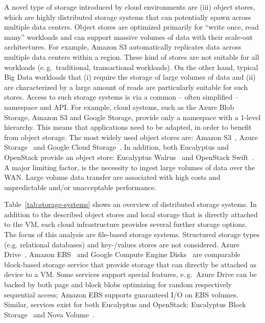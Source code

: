 \documentclass[times]{cpeauth}
\begin{document}
A novel type of storage introduced by cloud environments are (iii)
object stores, which are highly distributed storage systems that can
potentially spawn across multiple data centers. Object stores are
optimized primarily for ``write once, read many'' workloads and can
support massive volumes of data with their scale-out
architectures. For example, Amazon S3 automatically replicates data
across multiple data centers within a region. These kind of stores are
not suitable for all workloads (e.\,g.\ traditional, transactional
workloads). On the other hand, typical Big Data workloads that (i)
require the storage of large volumes of data and (ii) are
characterized by a large amount of reads are particularly suitable for
such stores. Access to such storage systems is via a common -- often
simplified -- namespace and API. For example, cloud systems, such as
the Azure Blob Storage, Amazon S3 and Google Storage, provide only a
namespace with a 1-level hierarchy. This means that applications need
to be adapted, in order to benefit from object
storage. The most widely used object stores are: Amazon
S3~\cite{amazons3}, Azure Storage~\cite{azure-blob-storage} and Google
Cloud Storage~\cite{google-storage}. In addition, both Eucalyptus and
OpenStack provide an object store: Eucalyptus Walrus~\cite{walrus} and
OpenStack Swift~\cite{openstack-swift}. A major limiting factor, is
the necessity to ingest large volumes of data over the WAN. Large
volume data transfer are associated with high costs and unpredictable
and/or unacceptable performance.

Table~\ref{tab:storage-systems} shows an overview of distributed storage
systems. In addition to the described object stores and local storage that is
directly attached to the VM, each cloud infrastructure provides several
further storage options. The focus of this analysis are file-based storage
systems. Structured storage types (e.g. relational databases) and key-/values
stores are not considered. Azure Drive~\cite{azure-drive}, Amazon
EBS~\cite{baron2010} and Google Compute Engine Disks~\cite{gce_disks} are
comparable block-based storage service that provide storage that can directly
be attached as device to a VM. Some services support special features, e.\,g.\
Azure Drive can be backed by both page and block blobs optimizing for random
respectively sequential access; Amazon EBS supports guaranteed I/O on EBS
volumes. Similar, services exist for both Eucalyptus and OpenStack: Eucalyptus
Block Storage~\cite{euca-block} and Nova Volume~\cite{nova-volume}.
\end{document}
